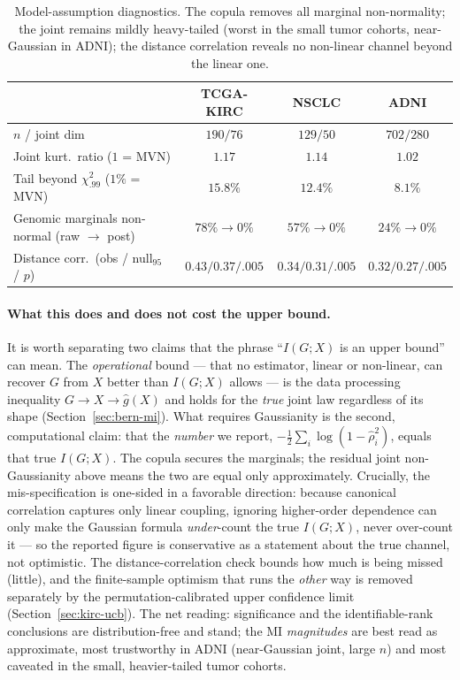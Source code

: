 \documentclass{article}
\begin{document}
\begin{table}[h]
\centering
\small
\begin{tabular}{lccc}
\toprule
 & TCGA-KIRC & NSCLC & ADNI \\
\midrule
$n$ / joint dim                       & $190/76$ & $129/50$ & $702/280$ \\
Joint kurt.\ ratio ($1$ = MVN)         & $1.17$   & $1.14$   & $1.02$ \\
Tail beyond $\chi^2_{.99}$ ($1\%$ = MVN) & $15.8\%$ & $12.4\%$ & $8.1\%$ \\
Genomic marginals non-normal (raw $\to$ post) & $78\%\!\to\!0\%$ & $57\%\!\to\!0\%$ & $24\%\!\to\!0\%$ \\
Distance corr.\ (obs / null$_{95}$ / $p$) & $0.43/0.37/.005$ & $0.34/0.31/.005$ & $0.32/0.27/.005$ \\
\bottomrule
\end{tabular}
\caption{Model-assumption diagnostics. The copula removes all marginal
non-normality; the joint remains mildly heavy-tailed (worst in the small tumor
cohorts, near-Gaussian in ADNI); the distance correlation reveals no non-linear
channel beyond the linear one.}
\label{tab:assumptions}
\end{table}

\paragraph{What this does and does not cost the upper bound.}
It is worth separating two claims that the phrase ``$I(G;X)$ is an upper bound''
can mean. The \emph{operational} bound --- that no estimator, linear or
non-linear, can recover $G$ from $X$ better than $I(G;X)$ allows --- is the data
processing inequality $G \to X \to \hat g(X)$ and holds for the \emph{true} joint
law regardless of its shape (Section~\ref{sec:bern-mi}). What requires Gaussianity
is the second, computational claim: that the \emph{number} we report,
$-\tfrac12\sum_i\log(1-\hat\rho_i^2)$, equals that true $I(G;X)$. The copula
secures the marginals; the residual joint non-Gaussianity above means the two are
equal only approximately. Crucially, the mis-specification is one-sided in a
favorable direction: because canonical correlation captures only linear
coupling, ignoring higher-order dependence can only make the Gaussian formula
\emph{under}-count the true $I(G;X)$, never over-count it --- so the reported
figure is conservative as a statement about the true channel, not optimistic.
The distance-correlation check bounds how much is being missed (little), and the
finite-sample optimism that runs the \emph{other} way is removed separately by
the permutation-calibrated upper confidence limit
(Section~\ref{sec:kirc-ucb}). The net reading: significance and the
identifiable-rank conclusions are distribution-free and stand; the MI
\emph{magnitudes} are best read as approximate, most trustworthy in ADNI
(near-Gaussian joint, large $n$) and most caveated in the small, heavier-tailed
tumor cohorts.
\end{document}
